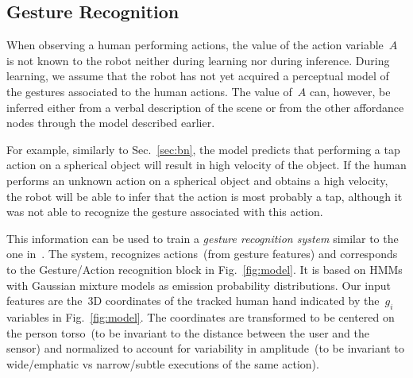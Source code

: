 \newcommand{\modeltwo}{
  \begin{tikzpicture}[scale=\myscalefactor, every node/.style={scale=\myscalefactor}]
  \matrix (M) [matrix of nodes, ampersand replacement=\&] {%
    grasp gesture HMM \& \standardhmm{1} \\
    tap gesture HMM \& \standardhmm{2} \\
    touch gesture HMM \& \standardhmm{3} \\
  };
  \end{tikzpicture}
}


\subsection{Gesture Recognition}
\label{sec:gesture_recognition}
When observing a human performing actions, the value of the action variable~$A$ is not known to the robot neither during learning nor during inference.
During learning, we assume that the robot has not yet acquired a perceptual model of the gestures associated to the human actions.
The value of~$A$ can, however, be inferred either from a verbal description of the scene or from the other affordance nodes through the \AffWords{} model described earlier.

For example, similarly to Sec.~\ref{sec:bn}, the \AffWords{} model predicts that performing a tap action on a spherical object will result in high velocity of the object.
If the human performs an unknown action on a spherical object and obtains a high velocity, the robot will be able to infer that the action is most probably a tap, although it was not able to recognize the gesture associated with this action.

This information can be used to train a \emph{gesture recognition system} similar to the one in~\cite{saponaro:2013:crhri}.
The system, %
recognizes actions~(from gesture features) and corresponds to the Gesture/Action recognition block in Fig.~\ref{fig:model}.
It is based on \acp{HMM} with Gaussian mixture models as emission probability distributions. %
Our input features are the~3D coordinates of the tracked human hand indicated by the~$g_i$ variables in Fig.~\ref{fig:model}.
The coordinates are transformed to be centered on the person torso~(to be invariant to the distance between the user and the sensor) and normalized to account for variability in amplitude~(to be invariant to wide/emphatic vs narrow/subtle executions of the same action).

